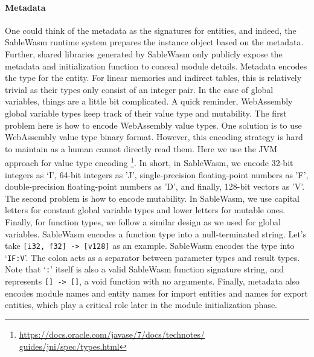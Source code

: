 \paragraph{Metadata}
One could think of the metadata as the signatures for entities, and indeed, the
SableWasm runtime system prepares the instance object based on the metadata.
Further, shared libraries generated by SableWasm only publicly expose the
metadata and initialization function to conceal module details. Metadata encodes
the type for the entity. For linear memories and indirect tables, this is
relatively trivial as their types only consist of an integer pair. In the case
of global variables, things are a little bit complicated. A quick reminder,
WebAssembly global variable types keep track of their value type and mutability.
The first problem here is how to encode WebAssembly value types. One solution is
to use WebAssembly value type binary format. However, this encoding strategy is
hard to maintain as a human cannot directly read them. Here we use the JVM
approach for value type encoding
\footnote{\url{https://docs.oracle.com/javase/7/docs/technotes/
        guides/jni/spec/types.html}}. In short, in SableWasm, we encode
32-bit integers as `I', 64-bit integers as 'J', single-precision floating-point
numbers as 'F', double-precision floating-point numbers as 'D', and finally,
128-bit vectors as 'V'. The second problem is how to encode mutability. In
SableWasm, we use capital letters for constant global variable types and lower
letters for mutable ones. Finally, for function types, we follow a similar
design as we used for global variables. SableWasm encodes a function type into a
null-terminated string. Let's take \texttt{[i32, f32] -> [v128]} as an example.
SableWasm encodes the type into `\texttt{IF:V}'. The colon acts as a separator
between parameter types and result types. Note that `\texttt{:}' itself is also
a valid SableWasm function signature string, and represents \texttt{[] -> []},
a void function with no arguments. Finally, metadata also encodes module names
and entity names for import entities and names for export entities, which play
a critical role later in the module initialization phase.

